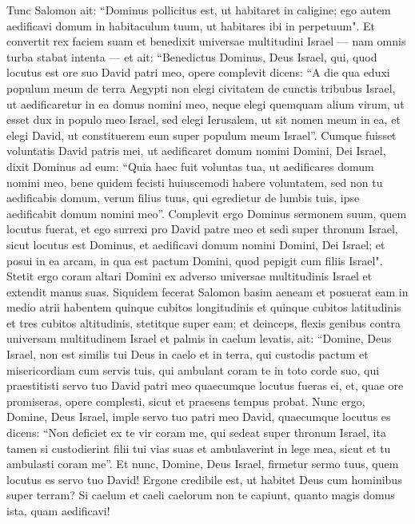 \begin{biblechapter}  
\verse Tunc Salomon ait: “Dominus pollicitus est, ut habitaret in caligine; 
\verse ego autem aedificavi domum in habitaculum tuum, ut habitares ibi in perpetuum". 
\verse Et convertit rex faciem suam et benedixit universae multitudini Israel — nam omnis turba stabat intenta — et ait: 
\verse “Benedictus Dominus, Deus Israel, qui, quod locutus est ore suo David patri meo, opere complevit dicens: 
\verse “A die qua eduxi populum meum de terra Aegypti non elegi civitatem de cunctis tribubus Israel, ut aedificaretur in ea domus nomini meo, neque elegi quemquam alium virum, ut esset dux in populo meo Israel, 
\verse sed elegi Ierusalem, ut sit nomen meum in ea, et elegi David, ut constituerem eum super populum meum Israel”. 
\verse Cumque fuisset voluntatis David patris mei, ut aedificaret domum nomini Domini, Dei Israel, 
\verse dixit Dominus ad eum: “Quia haec fuit voluntas tua, ut aedificares domum nomini meo, bene quidem fecisti huiuscemodi habere voluntatem, 
\verse sed non tu aedificabis domum, verum filius tuus, qui egredietur de lumbis tuis, ipse aedificabit domum nomini meo”. 
\verse Complevit ergo Dominus sermonem suum, quem locutus fuerat, et ego surrexi pro David patre meo et sedi super thronum Israel, sicut locutus est Dominus, et aedificavi domum nomini Domini, Dei Israel; 
\verse et posui in ea arcam, in qua est pactum Domini, quod pepigit cum filiis Israel". 
\verse Stetit ergo coram altari Domini ex adverso universae multitudinis Israel et extendit manus suas. 
\verse Siquidem fecerat Salomon basim aeneam et posuerat eam in medio atrii habentem quinque cubitos longitudinis et quinque cubitos latitudinis et tres cubitos altitudinis, stetitque super eam; et deinceps, flexis genibus contra universam multitudinem Israel et palmis in caelum levatis,  
\verse ait: “Domine, Deus Israel, non est similis tui Deus in caelo et in terra, qui custodis pactum et misericordiam cum servis tuis, qui ambulant coram te in toto corde suo, 
\verse qui praestitisti servo tuo David patri meo quaecumque locutus fueras ei, et, quae ore promiseras, opere complesti, sicut et praesens tempus probat. 
\verse Nunc ergo, Domine, Deus Israel, imple servo tuo patri meo David, quaecumque locutus es dicens: “Non deficiet ex te vir coram me, qui sedeat super thronum Israel, ita tamen si custodierint filii tui vias suas et ambulaverint in lege mea, sicut et tu ambulasti coram me”. 
\verse Et nunc, Domine, Deus Israel, firmetur sermo tuus, quem locutus es servo tuo David! 
\verse Ergone credibile est, ut habitet Deus cum hominibus super terram? Si caelum et caeli caelorum non te capiunt, quanto magis domus ista, quam aedificavi!  

\end{biblechapter}
